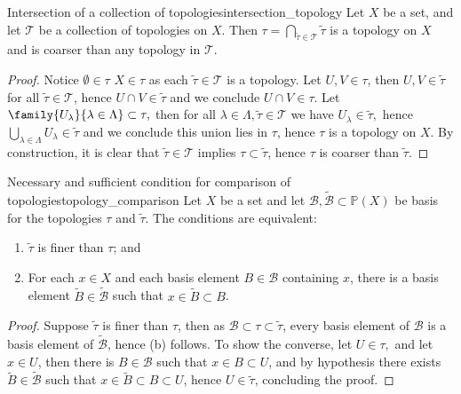 \begin{proposition}{Intersection of a collection of topologies}{intersection_topology}
    Let \(X\) be a set, and let \(\mathcal{T}\) be a collection of topologies on \(X\). Then \(\tau = \bigcap_{\tilde{\tau} \in \mathcal{T}}{\tilde{\tau}}\) is a topology on \(X\) and is coarser than any topology in \(\mathcal{T}\).
\end{proposition}
\begin{proof}
    Notice \(\emptyset \in \tau\) \(X \in \tau\) as each \(\tilde{\tau} \in \mathcal{T}\) is a topology. Let \(U, V \in \tau\), then \(U, V \in \tilde{\tau}\) for all \(\tilde{\tau} \in \mathcal{T}\), hence \(U \cap V \in \tilde{\tau}\) and we conclude \(U \cap V \in \tau.\) Let \(\family{U_\lambda}{\lambda \in \Lambda} \subset \tau,\) then for all \(\lambda \in \Lambda, \tilde{\tau} \in \mathcal{T}\) we have \(U_\lambda \in \tilde{\tau},\) hence \(\bigcup_{\lambda \in \Lambda}{U_\lambda} \in \tilde{\tau}\) and we conclude this union lies in \(\tau\), hence \(\tau\) is a topology on \(X\). By construction, it is clear that \(\tilde{\tau} \in \mathcal{T}\) implies \(\tau \subset \tilde{\tau}\), hence \(\tau\) is coarser than \(\tilde{\tau}\).
\end{proof}

\begin{proposition}{Necessary and sufficient condition for comparison of topologies}{topology_comparison}
    Let \(X\) be a set and let \(\mathcal{B}, \tilde{\mathcal{B}} \subset \mathbb{P}(X)\) be basis for the topologies \(\tau\) and \(\tilde{\tau}\). The conditions are equivalent:
    \begin{enumerate}[label=(\alph*)]
        \item \(\tilde{\tau}\) is finer than \(\tau\); and
        \item For each \(x \in X\) and each basis element \(B \in \mathcal{B}\) containing \(x\), there is a basis element \(\tilde{B} \in \tilde{\mathcal{B}}\) such that \(x \in \tilde{B} \subset B\).
    \end{enumerate}
\end{proposition}
\begin{proof}
    Suppose \(\tilde{\tau}\) is finer than \(\tau\), then as \(\mathcal{B} \subset \tau \subset \tilde{\tau}\), every basis element of \(\mathcal{B}\) is a basis element of \(\tilde{\mathcal{B}}\), hence (b) follows. To show the converse, let \(U \in \tau,\) and let \(x \in U\), then there is \(B \in \mathcal{B}\) such that \(x \in B \subset U\), and by hypothesis there exists \(\tilde{B} \in \tilde{\mathcal{B}}\) such that \(x \in \tilde{B} \subset B \subset U\), hence \(U \in \tilde{\tau}\), concluding the proof.
\end{proof}

